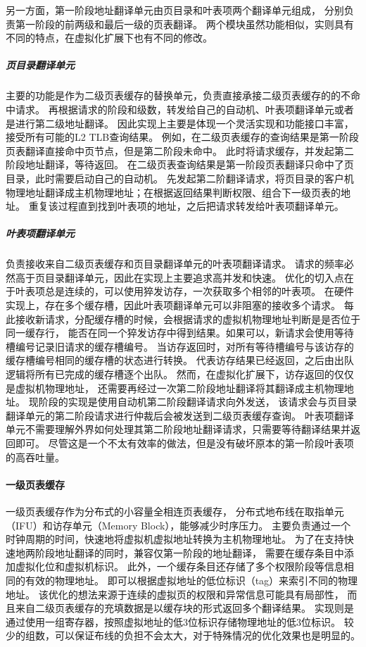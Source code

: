 另一方面，第一阶段地址翻译单元由页目录和叶表项两个翻译单元组成，
分别负责第一阶段的前两级和最后一级的页表翻译。
两个模块虽然功能相似，实则具有不同的特点，在虚拟化扩展下也有不同的修改。
\subparagraph{页目录翻译单元}
主要的功能是作为二级页表缓存的替换单元，负责直接承接二级页表缓存的的不命中请求。
再根据请求的阶段和级数，转发给自己的自动机、叶表项翻译单元或者是进行第二级地址翻译。
因此实现上主要是体现一个灵活实现和功能接口丰富，接受所有可能的L2 TLB查询结果。
例如，在二级页表缓存的查询结果是第一阶段页表翻译直接命中页节点，但是第二阶段未命中。
此时将请求缓存，并发起第二阶段地址翻译，等待返回。
在二级页表查询结果是第一阶段页表翻译只命中了页目录，此时需要启动自己的自动机。
先发起第二阶翻译请求，将页目录的客户机物理地址翻译成主机物理地址；在根据返回结果判断权限、组合下一级页表的地址。
重复该过程直到找到叶表项的地址，之后把请求转发给叶表项翻译单元。
\subparagraph{叶表项翻译单元}
负责接收来自二级页表缓存和页目录翻译单元的叶表项翻译请求。
请求的频率必然高于页目录翻译单元，因此在实现上主要追求高并发和快速。
优化的切入点在于叶表项总是连续的，可以使用猝发访存，一次获取多个相邻的叶表项。
在硬件实现上，存在多个缓存槽，因此叶表项翻译单元可以非阻塞的接收多个请求。
每此接收新请求，分配缓存槽的时候，会根据请求的虚拟机物理地址判断是是否位于同一缓存行，
能否在同一个猝发访存中得到结果。如果可以，新请求会使用等待槽编号记录旧请求的缓存槽编号。
当访存返回时，对所有等待槽编号与该访存的缓存槽编号相同的缓存槽的状态进行转换。
代表访存结果已经返回，之后由出队逻辑将所有已完成的缓存槽逐个出队。
然而，在虚拟化扩展下，访存返回的仅仅是虚拟机物理地址，
还需要再经过一次第二阶段地址翻译将其翻译成主机物理地址。
现阶段的实现是使用自动机第二阶段翻译请求向外发送，
该请求会与页目录翻译单元的第二阶段请求进行仲裁后会被发送到二级页表缓存查询。
叶表项翻译单元不需要理解外界如何处理其第二阶段地址翻译请求，只需要等待翻译结果并返回即可。
尽管这是一个不太有效率的做法，但是没有破坏原本的第一阶段叶表项的高吞吐量。

\paragraph{一级页表缓存}
一级页表缓存作为分布式的小容量全相连页表缓存，
分布式地布线在取指单元（IFU）和访存单元（Memory Block），能够减少时序压力。
主要负责通过一个时钟周期的时间，快速地将虚拟机虚拟地址转换为主机物理地址。
为了在支持快速地两阶段地址翻译的同时，兼容仅第一阶段的地址翻译，
需要在缓存条目中添加虚拟化位和虚拟机标识。
此外，一个缓存条目还存储了多个权限阶段等信息相同的有效的物理地址。
即可以根据虚拟地址的低位标识（tag）来索引不同的物理地址。
该优化的想法来源于连续的虚拟页的权限和异常信息可能具有局部性，
而且来自二级页表缓存的充填数据是以缓存块的形式返回多个翻译结果。
实现则是通过使用一组寄存器，按照虚拟地址的低3位标识存储物理地址的低3位标识。
较少的组数，可以保证布线的负担不会太大，对于特殊情况的优化效果也是明显的。

